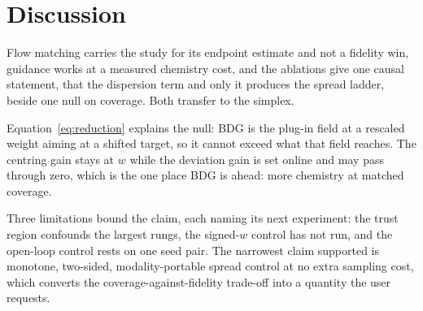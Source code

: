 \section{Discussion}

Flow matching carries the study for its endpoint estimate and not a fidelity win,
guidance works at a measured chemistry cost, and the ablations give one causal
statement, that the dispersion term and only it produces the spread ladder, beside one
null on coverage. Both transfer to the simplex.

Equation~\eqref{eq:reduction} explains the null: BDG is the plug-in field at a rescaled
weight aiming at a shifted target, so it cannot exceed what that field reaches. The
centring gain stays at $w$ while the deviation gain is set online and may pass through
zero, which is the one place BDG is ahead: more chemistry at matched coverage.

Three limitations bound the claim, each naming its next experiment: the trust region
confounds the largest rungs, the signed-$w$ control has not run, and the open-loop
control rests on one seed pair. The narrowest claim supported is monotone, two-sided,
modality-portable spread control at no extra sampling cost, which converts the
coverage-against-fidelity trade-off into a quantity the user requests.
